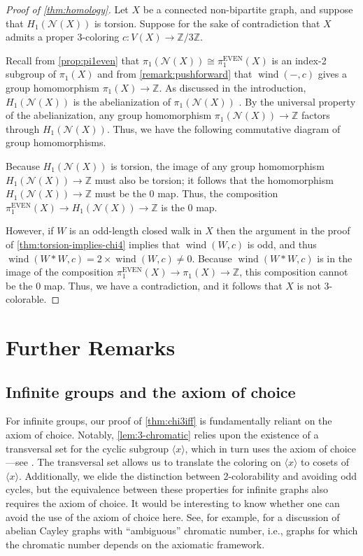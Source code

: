 \documentclass[12pt,letterpaper]{amsart}
\theoremstyle{definition}
\theoremstyle{remark}
\newcommand{\N}{{\mathcal N}}
\newcommand{\Z}{{\mathbb Z}}
\newcommand{\pieven}{\pi_1^{\mathrm{EVEN}}}
\DeclareMathOperator{\wind}{wind}
\begin{document}
\begin{proof}[Proof of \cref{thm:homology}]
Let $X$ be a connected non-bipartite graph, and suppose that $H_1(\N(X))$ is torsion. Suppose for the sake of contradiction that $X$ admits a proper 3-coloring $c:V(X)\to\Z/3\Z$.

Recall from \cref{prop:pi1even} that $\pi_1(\N(X))\cong \pieven(X)$ is an index-2 subgroup of $\pi_1(X)$ and from \cref{remark:pushforward} that $\wind(-,c)$ gives a group homomorphism $\pi_1(X)\to\Z$. As discussed in the introduction, $H_1(\N(X))$ is the abelianization of $\pi_1(\N(X))$ \cite[Theorem 2A.1]{Hat}. By the universal property of the abelianization, any group homomorphism $\pi_1(\N(X))\to \Z$ factors through $H_1(\N(X))$. Thus, we have the following commutative diagram of group homomorphisms.


Because $H_1(\N(X))$ is torsion, the image of any group homomorphism $H_1(\N(X))\to\Z$ must also be torsion; it follows that the homomorphism $H_1(\N(X))\to\Z$ must be the 0 map. Thus, the composition $\pieven(X)\to H_1(\N(X))\to\Z$ is the 0 map.

However, if $W$ is an odd-length closed walk in $X$ then the argument in the proof of \cref{thm:torsion-implies-chi4} implies that $\wind(W,c)$ is odd, and thus $\wind(W*W,c)=2\times\wind(W,c)\neq 0$. Because $\wind(W*W,c)$ is in the image of the composition $\pieven(X)\to\pi_1(X)\to\Z$, this composition cannot be the 0 map. Thus, we have a contradiction, and it follows that $X$ is not 3-colorable.
\end{proof}




\section{Further Remarks}\label{sec:concluding}


\subsection{Infinite groups and the axiom of choice} For infinite groups, our proof of \cref{thm:chi3iff} is fundamentally reliant on the axiom of choice. Notably, \cref{lem:3-chromatic} relies upon the existence of a transversal set for the cyclic subgroup $\langle x\rangle$, which in turn uses the axiom of choice---see \cite{Ker}. The transversal set allows us to translate the coloring on $\langle x\rangle$ to cosets of $\langle x\rangle$. Additionally, we elide the distinction between 2-colorability and avoiding odd cycles, but the equivalence between these properties for infinite graphs also requires the axiom of choice. It would be interesting to know whether one can avoid the use of the axiom of choice here. See, for example, \cite{Payne} for a discussion of abelian Cayley graphs with ``ambiguous'' chromatic number, i.e., graphs for which the chromatic number depends on the axiomatic framework.
\end{document}
